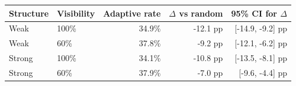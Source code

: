 \begin{tabular}{llrrr}
\toprule
Structure & Visibility & Adaptive rate & $\Delta$ vs random & 95\% CI for $\Delta$ \\
\midrule
Weak & 100\% & 34.9\% & -12.1 pp & [-14.9, -9.2] pp \\
Weak & 60\% & 37.8\% & -9.2 pp & [-12.1, -6.2] pp \\
Strong & 100\% & 34.1\% & -10.8 pp & [-13.5, -8.1] pp \\
Strong & 60\% & 37.9\% & -7.0 pp & [-9.6, -4.4] pp \\
\bottomrule
\end{tabular}
